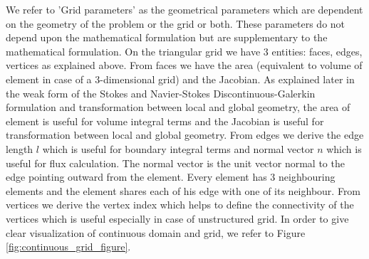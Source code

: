 \documentclass[a4paper,twoside,openright]{book}
\begin{document}
We refer to 'Grid parameters' as the geometrical parameters which are dependent on the geometry of the problem or the grid or both. These parameters do not depend upon the mathematical formulation but are supplementary to the mathematical formulation. On the triangular grid we have 3 entities: faces, edges, vertices as explained above. From faces we have the area (equivalent to volume of element in case of a 3-dimensional grid) and the Jacobian. As explained later in the weak form of the Stokes and Navier-Stokes Discontinuous-Galerkin formulation and transformation between local and global geometry, the area of element is useful for volume integral terms and the Jacobian is useful for transformation between local and global geometry. From edges we derive the edge length $l$ which is useful for boundary integral terms and normal vector $n$ which is useful for flux calculation. The normal vector is the unit vector normal to the edge pointing outward from the element. Every element has 3 neighbouring elements and the element shares each of his edge with one of its neighbour. From vertices we derive the vertex index which helps to define the connectivity of the vertices which is useful especially in case of unstructured grid. In order to give clear visualization of continuous domain and grid, we refer to Figure \ref{fig:continuous_grid_figure}.
\end{document}
